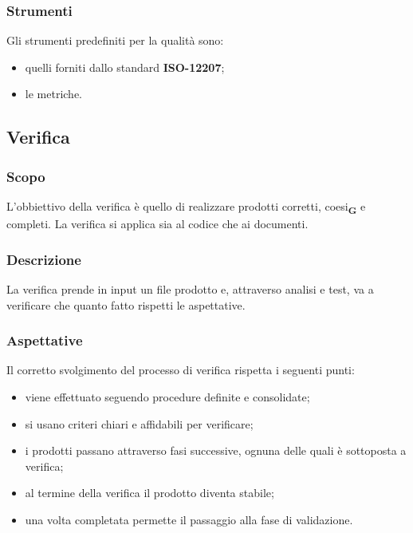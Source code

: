         \subsubsection{Strumenti}
        Gli strumenti predefiniti per la qualità sono:
        \begin{itemize}
            \item quelli forniti dallo standard \textbf{ISO-12207};
            \item le metriche.
        \end{itemize}
    \subsection{Verifica}
        \subsubsection{Scopo}
        L'obbiettivo della verifica è quello di realizzare prodotti corretti, coesi\textsubscript{\textbf{G}} e completi. La verifica si applica sia al codice che ai documenti.
        \subsubsection{Descrizione}
        La verifica prende in input un file prodotto e, attraverso analisi e test, va a verificare che quanto fatto rispetti le aspettative.
        \subsubsection{Aspettative}
        Il corretto svolgimento del processo di verifica rispetta i seguenti punti:
        \begin{itemize}
            \item viene effettuato seguendo procedure definite e consolidate;
            \item si usano criteri chiari e affidabili per verificare;
            \item i prodotti passano attraverso fasi successive, ognuna delle quali è sottoposta a verifica;
            \item al termine della verifica il prodotto diventa stabile;
            \item una volta completata permette il passaggio alla fase di validazione.
        \end{itemize}
